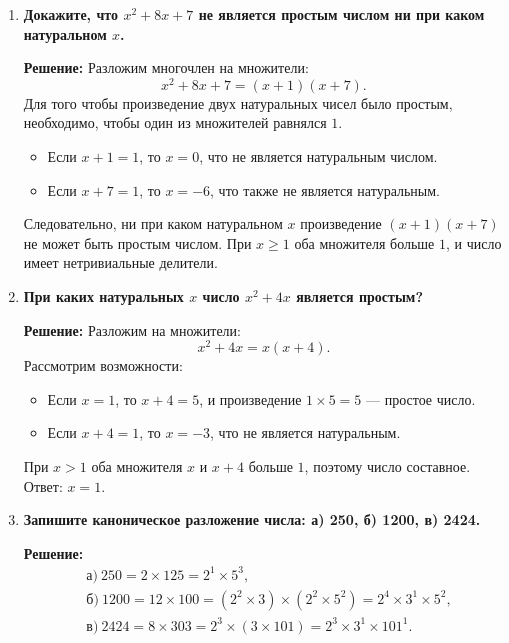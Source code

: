 \documentclass[12pt, a4paper]{article}
\begin{document}
\begin{enumerate}[label=\arabic*., wide=0pt, leftmargin=*]
\textbf{Решение:} 
Разложим на множители: $n^2 - 1 = (n - 1)(n + 1)$. 
Для того чтобы произведение двух натуральных множителей было простым, необходимо, чтобы один из множителей равнялся $1$. 
\begin{itemize}
\item Если $n - 1 = 1$, то $n = 2$, и тогда $n + 1 = 3$, $n^2 - 1 = 3$ — простое.
\item Если $n + 1 = 1$, то $n = 0$, что не является натуральным числом.
\end{itemize}
Проверка: при $n = 2$ число $n^2 - 1 = 3$ действительно простое. 
Следовательно, ответ: $n = 2$.

\item \textbf{Докажите, что $x^2 + 8x + 7$ не является простым числом ни при каком натуральном $x$.}

\textbf{Решение:} 
Разложим многочлен на множители:
\[
x^2 + 8x + 7 = (x+1)(x+7).
\]
Для того чтобы произведение двух натуральных чисел было простым, необходимо, чтобы один из множителей равнялся $1$.
\begin{itemize}
\item Если $x+1 = 1$, то $x = 0$, что не является натуральным числом.
\item Если $x+7 = 1$, то $x = -6$, что также не является натуральным.
\end{itemize}
Следовательно, ни при каком натуральном $x$ произведение $(x+1)(x+7)$ не может быть простым числом. 
При $x \ge 1$ оба множителя больше $1$, и число имеет нетривиальные делители.

\item \textbf{При каких натуральных $x$ число $x^2 + 4x$ является простым?}

\textbf{Решение:} 
Разложим на множители:
\[
x^2 + 4x = x(x+4).
\]
Рассмотрим возможности:
\begin{itemize}
\item Если $x = 1$, то $x+4 = 5$, и произведение $1 \times 5 = 5$ — простое число.
\item Если $x+4 = 1$, то $x = -3$, что не является натуральным.
\end{itemize}
При $x > 1$ оба множителя $x$ и $x+4$ больше $1$, поэтому число составное.
Ответ: $x = 1$.

\item \textbf{Запишите каноническое разложение числа: а) 250, б) 1200, в) 2424.}

\textbf{Решение:}
\[
\begin{aligned}
&\text{а)}\ 250 = 2 \times 125 = 2^1 \times 5^3,\\
&\text{б)}\ 1200 = 12 \times 100 = (2^2 \times 3) \times (2^2 \times 5^2) = 2^4 \times 3^1 \times 5^2,\\
&\text{в)}\ 2424 = 8 \times 303 = 2^3 \times (3 \times 101) = 2^3 \times 3^1 \times 101^1.
\end{aligned}
\]


\end{enumerate}
\end{document}
